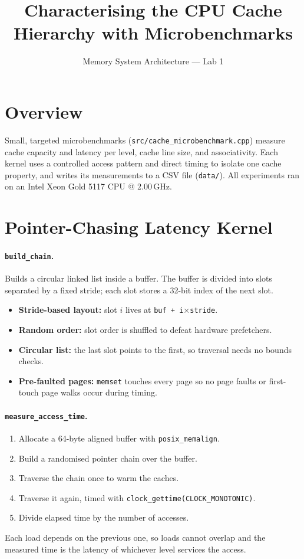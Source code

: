 \documentclass[11pt]{article}
\title{Characterising the CPU Cache Hierarchy with Microbenchmarks}
\author{Memory System Architecture --- Lab 1}
\date{}
\begin{document}
\maketitle

\section{Overview}
Small, targeted microbenchmarks (\texttt{src/cache\_microbenchmark.cpp}) measure
cache capacity and latency per level, cache line size, and associativity.
Each kernel uses a controlled access pattern and direct timing to isolate one
cache property, and writes its measurements to a CSV file (\texttt{data/}).
All experiments ran on an Intel Xeon Gold 5117 CPU @ 2.00\,GHz.

\section{Pointer-Chasing Latency Kernel}
\paragraph{\texttt{build\_chain}.} Builds a circular linked list inside a buffer.
The buffer is divided into slots separated by a fixed stride; each slot stores a
32-bit index of the next slot.
\begin{itemize}
  \item \textbf{Stride-based layout:} slot $i$ lives at \texttt{buf + i}$\times$\texttt{stride}.
  \item \textbf{Random order:} slot order is shuffled to defeat hardware prefetchers.
  \item \textbf{Circular list:} the last slot points to the first, so traversal needs no bounds checks.
  \item \textbf{Pre-faulted pages:} \texttt{memset} touches every page so no page faults or
        first-touch page walks occur during timing.
\end{itemize}

\paragraph{\texttt{measure\_access\_time}.}
\begin{enumerate}
  \item Allocate a 64-byte aligned buffer with \texttt{posix\_memalign}.
  \item Build a randomised pointer chain over the buffer.
  \item Traverse the chain once to warm the caches.
  \item Traverse it again, timed with \texttt{clock\_gettime(CLOCK\_MONOTONIC)}.
  \item Divide elapsed time by the number of accesses.
\end{enumerate}
Each load depends on the previous one, so loads cannot overlap and the measured
time is the latency of whichever level services the access.
\end{document}

